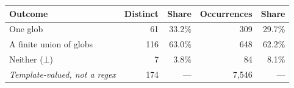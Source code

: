 \begin{tabular}{@{}lrrrr@{}}
\toprule
Outcome & Distinct & Share & Occurrences & Share \\
\midrule
One glob & 61 & 33.2\% & 309 & 29.7\% \\
A finite union of globs & 116 & 63.0\% & 648 & 62.2\% \\
Neither ($\bot$) & 7 & 3.8\% & 84 & 8.1\% \\
\emph{Template-valued, not a regex} & 174 & --- & 7,546 & --- \\
\bottomrule
\end{tabular}
